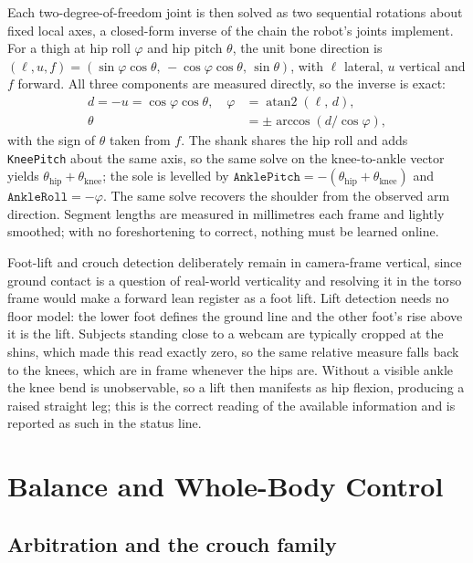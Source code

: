 \documentclass[twocolumn]{article}
\begin{document}
Each two-degree-of-freedom joint is then solved as two sequential rotations about fixed local
axes, a closed-form inverse of the chain the robot's joints implement. For a thigh at hip roll
$\varphi$ and hip pitch $\theta$, the unit bone direction is
$(\ell, u, f) = (\sin\varphi\cos\theta,\, -\cos\varphi\cos\theta,\, \sin\theta)$, with $\ell$
lateral, $u$ vertical and $f$ forward. All three components are measured directly, so the
inverse is exact:
\begin{align}
d = -u = \cos\varphi\cos\theta, \quad \varphi &= \operatorname{atan2}(\ell,\, d), \nonumber \\
\theta &= \pm \arccos\!\left(d / \cos\varphi\right),
\label{eq:inv}
\end{align}
with the sign of $\theta$ taken from $f$. The shank shares the hip roll and adds
\texttt{KneePitch} about the same axis, so the same solve on the knee-to-ankle vector yields
$\theta_{\text{hip}} + \theta_{\text{knee}}$; the sole is levelled by
$\texttt{AnklePitch} = -(\theta_{\text{hip}} + \theta_{\text{knee}})$ and
$\texttt{AnkleRoll} = -\varphi$. The same solve recovers the shoulder from the observed arm
direction. Segment lengths are measured in millimetres each frame and lightly smoothed; with no
foreshortening to correct, nothing must be learned online.

Foot-lift and crouch detection deliberately remain in camera-frame vertical, since ground
contact is a question of real-world verticality and resolving it in the torso frame would make
a forward lean register as a foot lift. Lift detection needs no floor model: the lower foot
defines the ground line and the other foot's rise above it is the lift. Subjects standing close
to a webcam are typically cropped at the shins, which made this read exactly zero, so the same
relative measure falls back to the knees, which are in frame whenever the hips are. Without a
visible ankle the knee bend is unobservable, so a lift then manifests as hip flexion, producing
a raised straight leg; this is the correct reading of the available information and is reported
as such in the status line.

\section{Balance and Whole-Body Control}

\subsection{Arbitration and the crouch family}
\end{document}
